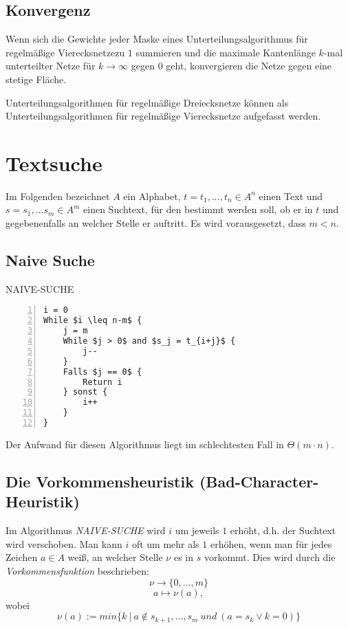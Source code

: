 \subsection{Konvergenz}
Wenn sich die Gewichte jeder Maske eines Unterteilungsalgorithmus für regelmäßige Vierecksnetzezu \(1\) summieren und die maximale Kantenlänge \(k\)-mal unterteilter Netze für \(k \rightarrow \infty\) gegen \(0\) geht, konvergieren die Netze gegen eine stetige Fläche.

Unterteilungsalgorithmen für regelmäßige Dreiecksnetze können als Unterteilungsalgorithmen für regelmäßige Vierecksnetze aufgefasst werden.



\section{Textsuche}
Im Folgenden bezeichnet \(A\) ein Alphabet, \(t = t_1,...,t_n \in A^n\) einen Text und \(s = s_1,...s_m \in A^m\) einen Suchtext, für den bestimmt werden soll, ob er in \(t\) und gegebenenfalls an welcher Stelle er auftritt. Es wird vorausgesetzt, dass \(m < n\).

\subsection{Naive Suche}
\begin{minipage}{\textwidth}
NAIVE-SUCHE
\begin{lstlisting}[frame=single,numbers=left,mathescape]
i = 0
While $i \leq n-m$ {
	j = m
	While $j > 0$ and $s_j = t_{i+j}$ {
		j--
	}
	Falls $j == 0$ {
		Return i
	} sonst {
		i++
	}
}
\end{lstlisting}
\end{minipage}
Der Aufwand für diesen Algorithmus liegt im schlechtesten Fall in \(\Theta(m\cdot n)\).


\subsection{Die Vorkommensheuristik (Bad-Character-Heuristik)}
Im Algorithmus \textit{NAIVE-SUCHE} wird \(i\) um jeweils \(1\) erhöht, d.h. der Suchtext wird verschoben. Man kann \(i\) oft um mehr als \(1\) erhöhen, wenn man für jedes Zeichen \(a \in A\) weiß, an welcher Stelle \(\nu\) es in \(s\) vorkommt. Dies wird durch die \textit{Vorkommensfunktion} beschrieben:
\[\nu \rightarrow \{0,...,m\}\]
\[a \mapsto \nu(a),\]
wobei
\[\nu(a) := min\{k~|~a \notin s_{k+1},...,s_m~und~(a=s_k \lor k=0)\}\]

